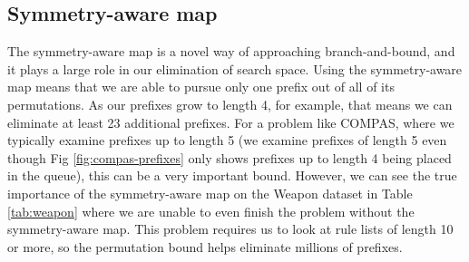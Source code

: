 \subsection{Symmetry-aware map}
\label{exp:ablation-pmap}
The symmetry-aware map is a novel way of approaching branch-and-bound, and it plays a large role in our elimination of search space.
Using the symmetry-aware map means that we are able to pursue only one prefix out of all of its permutations.
As our prefixes grow to length 4, for example, that means we can eliminate at least 23 additional prefixes.
For a problem like COMPAS, where we typically examine prefixes up to length 5 (we examine prefixes of length 5 even though Fig \ref{fig:compas-prefixes} only shows prefixes up to length 4 being placed in the queue), this can be a very important bound.
However, we can see the true importance of the symmetry-aware map on the Weapon dataset in Table \ref{tab:weapon} where we are unable to even finish the problem without the symmetry-aware map.
This problem requires us to look at rule lists of length 10 or more, so the permutation bound helps eliminate millions of prefixes.

